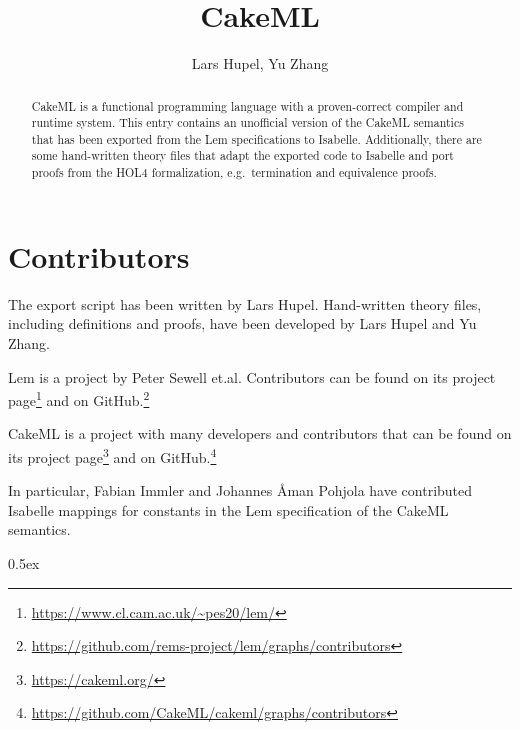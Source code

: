 \documentclass[11pt,a4paper]{report}
\begin{document}
\title{CakeML}
\author{Lars Hupel, Yu Zhang}
\maketitle

\begin{abstract}
  CakeML is a functional programming language with a proven-correct compiler and runtime system.
  This entry contains an unofficial version of the CakeML semantics that has been exported from the Lem specifications to Isabelle.
  Additionally, there are some hand-written theory files that adapt the exported code to Isabelle and port proofs from the HOL4 formalization, e.g.\ termination and equivalence proofs.
\end{abstract}

\tableofcontents

\clearpage

\section*{Contributors}

The export script has been written by Lars Hupel.
Hand-written theory files, including definitions and proofs, have been developed by Lars Hupel and Yu Zhang.

Lem is a project by Peter Sewell et.al.
Contributors can be found on its project page\footnote{\url{https://www.cl.cam.ac.uk/~pes20/lem/}} and on GitHub.\footnote{\url{https://github.com/rems-project/lem/graphs/contributors}}

CakeML is a project with many developers and contributors that can be found on its project page\footnote{\url{https://cakeml.org/}} and on GitHub.\footnote{\url{https://github.com/CakeML/cakeml/graphs/contributors}}

In particular, Fabian Immler and Johannes \AA{}man Pohjola have contributed Isabelle mappings for constants in the Lem specification of the CakeML semantics.

\parindent 0pt\parskip 0.5ex



%
%
\end{document}
